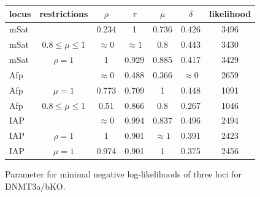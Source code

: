 \begin{figure}[h]
\begin{center}
\begin{tabularx}{\textwidth}{l|c|c|c|c|c|c}
locus&	restrictions&	$\rho$&	$\tau$&	$\mu$&	$\delta$&	likelihood\\
\hline
mSat&	&	0.234&	1&	0.736&	0.426&	3496\\%
mSat&	$0.8 \leq \mu \leq 1$&	$\approx 0$&	$\approx 1$&	0.8&	0.443&	3430\\%
mSat&	$\rho=1$&	1&	0.929&	0.885&	0.417&	3429\\%
Afp&	&	$\approx 0$&	0.488&	0.366&	$\approx 0$&	2659\\%
Afp&	$\mu=1$&	0.773&	0.709&	1&	0.448&	1091\\%
Afp&	$0.8 \leq \mu \leq 1$& 0.51&	0.866&	0.8&	0.267&	1046\\
IAP&	&	$\approx 0$&	0.994&	0.837&	0.496&	2494\\%
IAP&	$\rho=1$&	1&	0.901&	$\approx1$&	0.391&	2423\\%
IAP&	$\mu=1$&	0.974&	0.901&	1&	0.375&	2456\\%
\end{tabularx}
\end{center}
\label{DNMT3KO}
\caption{Parameter for minimal negative log-likelihoods of three loci for DNMT3a/bKO.}
\end{figure}

